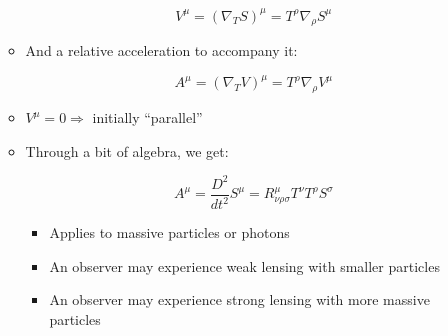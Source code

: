 \begin{itemize}
\begin{itemize}
        $$V^{\mu}=(\nabla_T S)^{\mu}=T^{\rho}\nabla_{\rho}S^{\mu}$$

      \item And a relative acceleration to accompany it:

        $$A^{\mu}=(\nabla_T V)^{\mu}=T^{\rho}\nabla_{\rho}V^{\mu}$$

      \item $V^{\mu}=0 \Rightarrow$ initially ``parallel''

      \item Through a bit of algebra, we get:

        $$A^{\mu}=\frac{D^2}{dt^2}S^{\mu}=R^{\mu}_{\nu\rho\sigma}T^{\nu}T^{\rho}S^{\sigma}$$

        \begin{itemize}

          \item Applies to massive particles or photons

          \item An observer may experience weak lensing with smaller particles

          \item An observer may experience strong lensing with more massive particles

        \end{itemize}

    \end{itemize}

\end{itemize}



